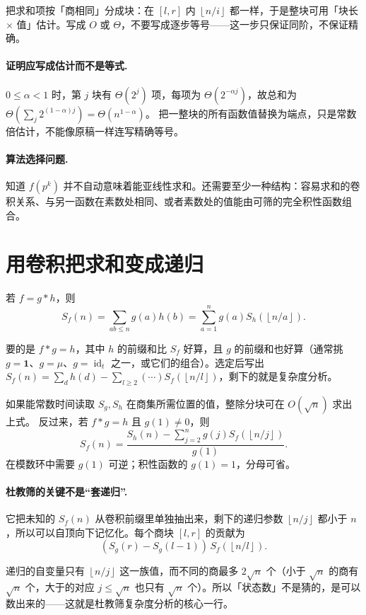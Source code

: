 \documentclass[UTF8,a4paper,11pt,twoside,openright,fontset=fandol]{ctexbook}
\theoremstyle{definition}
\newcommand{\one}{\mathbf 1}
\newcommand{\id}{\operatorname{id}}
\newcommand{\floor}[1]{\left\lfloor #1\right\rfloor}
\begin{document}
\begin{tip}
把求和项按「商相同」分成块：在 $[l,r]$ 内 $\floor{n/i}$ 都一样，于是整块可用「块长 $\times$ 值」估计。写成 $O$ 或 $\Theta$，不要写成逐步等号——这一步只保证同阶，不保证精确。
\end{tip}


\paragraph{证明应写成估计而不是等式.}
$0\le\alpha<1$ 时，第 $j$ 块有 $\Theta(2^j)$ 项，每项为 $\Theta(2^{-\alpha j})$，故总和为 $\Theta(\sum_j2^{(1-\alpha)j})=\Theta(n^{1-\alpha})$。
把一整块的所有函数值替换为端点，只是常数倍估计，不能像原稿一样连写精确等号。
\paragraph{算法选择问题.} 知道 $f(p^k)$ 并不自动意味着能亚线性求和。还需要至少一种结构：容易求和的卷积关系、与另一函数在素数处相同、或者素数处的值能由可筛的完全积性函数组合。


\section{用卷积把求和变成递归}
若 $f=g*h$，则
\[
S_f(n)=\sum_{ab\le n}g(a)h(b)
=\sum_{a=1}^n g(a)S_h(\floor{n/a}).
\]

\begin{tip}[选 $g$ 的原则]
要的是 $f*g=h$，其中 $h$ 的前缀和比 $S_f$ 好算，且 $g$ 的前缀和也好算（通常挑 $g=\one$、$g=\mu$、$g=\id_t$ 之一，或它们的组合）。选定后写出 $S_f(n)=\sum_{d}h(d)-\sum_{l\ge2}(\cdots)S_f(\floor{n/l})$，剩下的就是复杂度分析。
\end{tip}

如果能常数时间读取 $S_g,S_h$ 在商集所需位置的值，整除分块可在 $O(\sqrt n)$ 求出上式。
反过来，若 $f*g=h$ 且 $g(1)\ne0$，则
\[
\boxed{S_f(n)=\frac{S_h(n)-\sum_{j=2}^n g(j)S_f(\floor{n/j})}{g(1)}}.
\]
在模数环中需要 $g(1)$ 可逆；积性函数的 $g(1)=1$，分母可省。


\paragraph{杜教筛的关键不是“套递归”.}
它把未知的 $S_f(n)$ 从卷积前缀里单独抽出来，剩下的递归参数 $\floor{n/j}$ 都小于 $n$，所以可以自顶向下记忆化。每个商块 $[l,r]$ 的贡献为
\[
 (S_g(r)-S_g(l-1))\,S_f(\floor{n/l}).
\]

\begin{tip}[记忆化为什么够用]
递归的自变量只有 $\floor{n/j}$ 这一族值，而不同的商最多 $2\sqrt n$ 个（小于 $\sqrt n$ 的商有 $\sqrt n$ 个，大于的对应 $j\le\sqrt n$ 也只有 $\sqrt n$ 个）。所以「状态数」不是猜的，是可以数出来的——这就是杜教筛复杂度分析的核心一行。
\end{tip}
\end{document}
